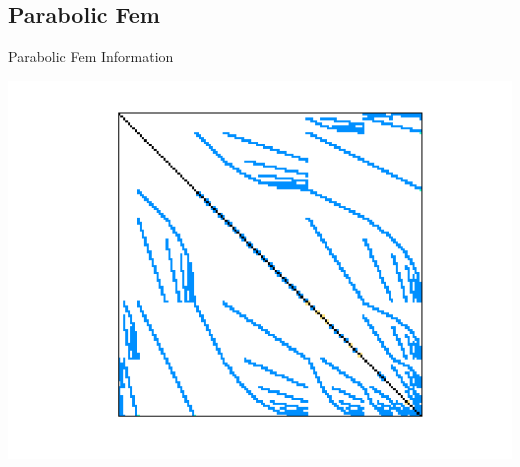 \subsection{Parabolic Fem}
\begin{table}[h!]
	\begin{minipage}{0.5\linewidth}
		\caption{Parabolic Fem Information}
		\label{table:Parabolic Fem}
		\centering
        
	\end{minipage}\hfill
	\begin{minipage}{0.45\linewidth}
		\centering
		\includegraphics[width=1\textwidth]{figs/parabolic_fem.png}
		\label{fig:Parabolic Fem}
	\end{minipage}
\end{table}



